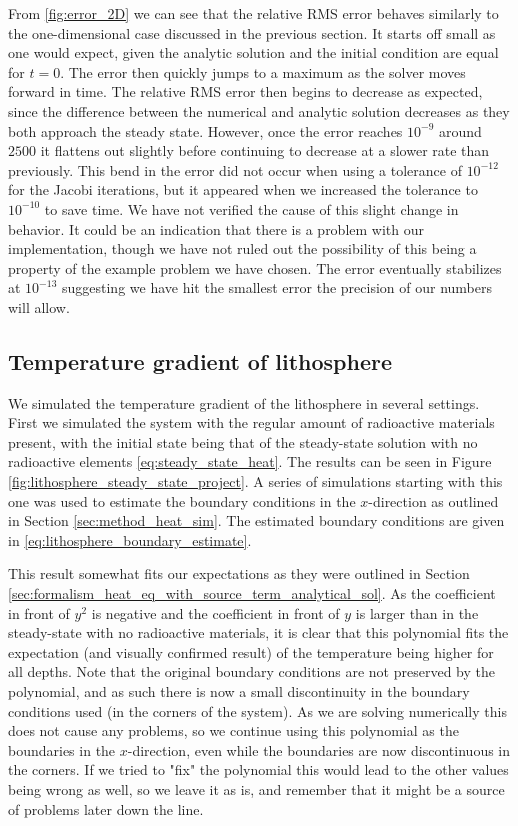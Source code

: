 \documentclass[reprint,english,notitlepage]{revtex4-1}  %
\begin{document}
From \autoref{fig:error_2D} we can see that the relative RMS error behaves similarly to the one-dimensional case discussed in the previous section. It starts off small as one would expect, given the analytic solution and the initial condition are equal for \(t=0\). The error then quickly jumps to a maximum as the solver moves forward in time. The relative RMS error then begins to decrease as expected, since the difference between the numerical and analytic solution decreases as they both approach the steady state. However, once the error reaches \(10^{-9}\) around \(2500\) it flattens out slightly before continuing to decrease at a slower rate than previously. This bend in the error did not occur when using a tolerance of \(10^{-12}\) for the Jacobi iterations, but it appeared when we increased the tolerance to \(10^{-10}\) to save time. We have not verified the cause of this slight change in behavior. It could be an indication that there is a problem with our implementation, though we have not ruled out the possibility of this being a property of the example problem we have chosen. The error eventually stabilizes at \(10^{-13}\) suggesting we have hit the smallest error the precision of our numbers will allow.


\subsection{Temperature gradient of lithosphere} \label{sec:discussion_lithosphere}

We simulated the temperature gradient of the lithosphere in several settings. First we simulated the system with the regular amount of radioactive materials present, with the initial state being that of the steady-state solution with no radioactive elements \eqref{eq:steady_state_heat}. The results can be seen in Figure \ref{fig:lithosphere_steady_state_project}. A series of simulations starting with this one was used to estimate the boundary conditions in the $x$-direction as outlined in Section \ref{sec:method_heat_sim}. The estimated boundary conditions are given in \eqref{eq:lithosphere_boundary_estimate}. 

This result somewhat fits our expectations as they were outlined in Section \ref{sec:formalism_heat_eq_with_source_term_analytical_sol}. 
As the coefficient in front of $y^2$ is negative and the coefficient in front of $y$ is larger than in the steady-state with no radioactive materials, it is clear that this polynomial fits the expectation (and visually confirmed result) of the temperature being higher for all depths. Note that the original boundary conditions are not preserved by the polynomial, and as such there is now a small discontinuity in the boundary conditions used (in the corners of the system). As we are solving numerically this does not cause any problems, so we continue using this polynomial as the boundaries in the $x$-direction, even while the boundaries are now discontinuous in the corners. If we tried to "fix" the polynomial this would lead to the other values being wrong as well, so we leave it as is, and remember that it might be a source of problems later down the line. 
\end{document}

